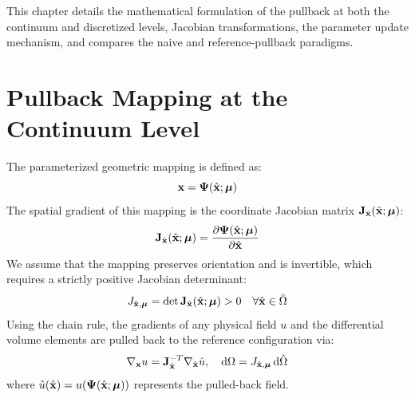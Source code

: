 This chapter details the mathematical formulation of the pullback at both the continuum and discretized levels, Jacobian transformations, the parameter update mechanism, and compares the naive and reference-pullback paradigms.

\section{Pullback Mapping at the Continuum Level}
The parameterized geometric mapping is defined as:
\begin{equation}
    \mathbf{x} = \boldsymbol{\Psi}(\hat{\mathbf{x}}; \boldsymbol{\mu})
\end{equation}
The spatial gradient of this mapping is the coordinate Jacobian matrix $\mathbf{J}_{\hat{\mathbf{x}}}(\hat{\mathbf{x}}; \boldsymbol{\mu})$:
\begin{equation}
    \mathbf{J}_{\hat{\mathbf{x}}}(\hat{\mathbf{x}}; \boldsymbol{\mu}) = \frac{\partial \boldsymbol{\Psi}(\hat{\mathbf{x}}; \boldsymbol{\mu})}{\partial \hat{\mathbf{x}}}
\end{equation}
We assume that the mapping preserves orientation and is invertible, which requires a strictly positive Jacobian determinant:
\begin{equation}
    J_{\hat{\mathbf{x}}, \boldsymbol{\mu}} = \det \mathbf{J}_{\hat{\mathbf{x}}}(\hat{\mathbf{x}}; \boldsymbol{\mu}) > 0 \quad \forall \hat{\mathbf{x}} \in \hat{\Omega}
\end{equation}
Using the chain rule, the gradients of any physical field $u$ and the differential volume elements are pulled back to the reference configuration via:
\begin{equation}
    \nabla_{\mathbf{x}} u = \mathbf{J}_{\hat{\mathbf{x}}}^{-T} \nabla_{\hat{\mathbf{x}}} \hat{u}, \quad \mathrm{d}\Omega = J_{\hat{\mathbf{x}}, \boldsymbol{\mu}} \, \mathrm{d}\hat{\Omega}
\end{equation}
where $\hat{u}(\hat{\mathbf{x}}) = u(\boldsymbol{\Psi}(\hat{\mathbf{x}}; \boldsymbol{\mu}))$ represents the pulled-back field.

